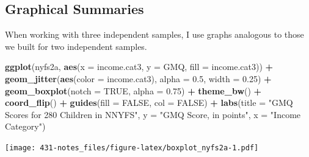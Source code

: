 \documentclass[
]{book}
\newenvironment{Shaded}{\begin{snugshade}}{\end{snugshade}}
\newcommand{\DataTypeTok}[1]{\textcolor[rgb]{0.13,0.29,0.53}{#1}}
\newcommand{\FloatTok}[1]{\textcolor[rgb]{0.00,0.00,0.81}{#1}}
\newcommand{\KeywordTok}[1]{\textcolor[rgb]{0.13,0.29,0.53}{\textbf{#1}}}
\newcommand{\NormalTok}[1]{#1}
\newcommand{\OperatorTok}[1]{\textcolor[rgb]{0.81,0.36,0.00}{\textbf{#1}}}
\newcommand{\OtherTok}[1]{\textcolor[rgb]{0.56,0.35,0.01}{#1}}
\newcommand{\StringTok}[1]{\textcolor[rgb]{0.31,0.60,0.02}{#1}}
\begin{document}
\begin{Shaded}
\end{Shaded}

\hypertarget{graphical-summaries}{%
\subsection{Graphical Summaries}\label{graphical-summaries}}

When working with three independent samples, I use graphs analogous to those we built for two independent samples.

\begin{Shaded}
\begin{Highlighting}[]
\KeywordTok{ggplot}\NormalTok{(nyfs2a, }\KeywordTok{aes}\NormalTok{(}\DataTypeTok{x =}\NormalTok{ income.cat3, }\DataTypeTok{y =}\NormalTok{ GMQ, }\DataTypeTok{fill =}\NormalTok{ income.cat3)) }\OperatorTok{+}
\StringTok{  }\KeywordTok{geom_jitter}\NormalTok{(}\KeywordTok{aes}\NormalTok{(}\DataTypeTok{color =}\NormalTok{ income.cat3), }\DataTypeTok{alpha =} \FloatTok{0.5}\NormalTok{, }\DataTypeTok{width =} \FloatTok{0.25}\NormalTok{) }\OperatorTok{+}
\StringTok{  }\KeywordTok{geom_boxplot}\NormalTok{(}\DataTypeTok{notch =} \OtherTok{TRUE}\NormalTok{, }\DataTypeTok{alpha =} \FloatTok{0.75}\NormalTok{) }\OperatorTok{+}
\StringTok{  }\KeywordTok{theme_bw}\NormalTok{() }\OperatorTok{+}
\StringTok{  }\KeywordTok{coord_flip}\NormalTok{() }\OperatorTok{+}
\StringTok{  }\KeywordTok{guides}\NormalTok{(}\DataTypeTok{fill =} \OtherTok{FALSE}\NormalTok{, }\DataTypeTok{col =} \OtherTok{FALSE}\NormalTok{) }\OperatorTok{+}
\StringTok{  }\KeywordTok{labs}\NormalTok{(}\DataTypeTok{title =} \StringTok{"GMQ Scores for 280 Children in NNYFS"}\NormalTok{,}
       \DataTypeTok{y =} \StringTok{"GMQ Score, in points"}\NormalTok{, }\DataTypeTok{x =} \StringTok{"Income Category"}\NormalTok{)}
\end{Highlighting}
\end{Shaded}

\texttt{[image: 431-notes\_files/figure-latex/boxplot\_nyfs2a-1.pdf]}
\end{document}
